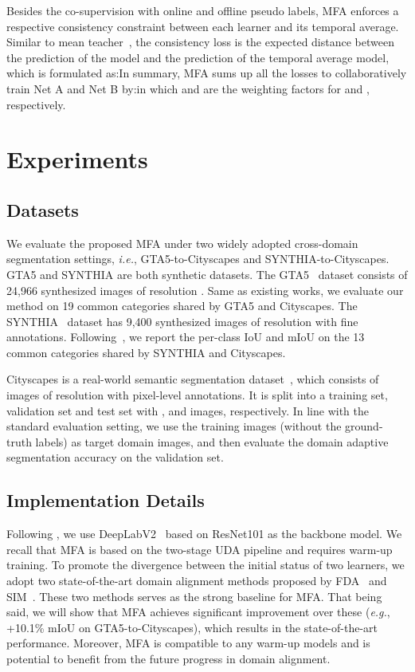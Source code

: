 \documentclass{bmvc2k}
\begin{document}
Besides the co-supervision with online and offline pseudo labels, MFA enforces a respective consistency constraint between each learner and its temporal average. Similar to mean teacher~\cite{tarvainen2017mean}, the consistency loss is the expected distance between the prediction of the model and the prediction of the temporal average model, which is formulated as:In summary, MFA sums up all the losses to collaboratively train Net A and Net B by:in which   and   are the weighting factors for   and , respectively.

\section{Experiments}
\subsection{Datasets}
We evaluate the proposed MFA under two widely adopted cross-domain segmentation settings, \emph{i.e.}, GTA5-to-Cityscapes and SYNTHIA-to-Cityscapes. 
GTA5 and SYNTHIA are both synthetic datasets. The GTA5~\cite{richter2016playing} dataset consists of 24,966 synthesized images of resolution . Same as existing works, we evaluate our method on 19 common categories shared by GTA5 and Cityscapes. The SYNTHIA~\cite{ros2016synthia} dataset has 9,400 synthesized images of resolution  with fine annotations. Following~\cite{RN135,RN180}, we report the per-class IoU and mIoU on the 13 common categories shared by SYNTHIA and Cityscapes. 

Cityscapes is a real-world semantic segmentation dataset~\cite{cordts2016cityscapes}, which consists of  images of resolution  with pixel-level annotations. 
It is split into a training set, validation set and test set with ,  and  images, respectively. In line with the standard evaluation setting, we use the  training images (without the ground-truth labels) as target domain images, and then evaluate the domain adaptive segmentation accuracy on the validation set. 

\subsection{Implementation Details} \label{section:architecture}
Following \cite{RN135,RN180}, we use DeepLabV2~\cite{chen2017deeplab} based on ResNet101 \cite{he2016deep} as the backbone model. We recall that MFA is based on the two-stage UDA pipeline and requires warm-up training. To promote the divergence between the initial status of two learners, we adopt two state-of-the-art domain alignment methods proposed by FDA~\cite{RN180} and SIM~\cite{RN135}. 
These two methods serves as the strong baseline for MFA. That being said, we will show that MFA achieves significant improvement over these (\emph{e.g.}, +10.1\% mIoU on GTA5-to-Cityscapes), which results in the state-of-the-art performance. Moreover, MFA is compatible to any warm-up models and is potential to benefit from the future progress in domain alignment. 
\end{document}
